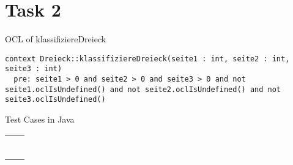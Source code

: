\chapter{Task 2}
\begin{parlist}
 \item OCL of klassifiziereDreieck
 \begin{lstlisting}[language=OCL,frame=trBL]
context Dreieck::klassifiziereDreieck(seite1 : int, seite2 : int, seite3 : int) 
  pre: seite1 > 0 and seite2 > 0 and seite3 > 0 and not seite1.oclIsUndefined() and not seite2.oclIsUndefined() and not seite3.oclIsUndefined()
\end{lstlisting}
\item Test Cases in Java

\begin{center}
\begin{longtable}[c]{ | p{12cm} | p{4cm} | }
  \hline
  \begin{lstlisting}[language=java,frame=trBL]


\end{lstlisting}
\end{longtable}
\end{center}
\end{parlist}
